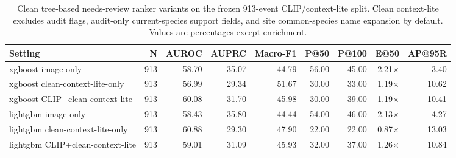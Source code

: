 \begin{table}[h]
\centering
\caption{Clean tree-based needs-review ranker variants on the frozen 913-event CLIP/context-lite split. Clean context-lite excludes audit flags, audit-only current-species support fields, and site common-species name expansion by default. Values are percentages except enrichment.}
\label{tab:needs_review_tree_rankers_clean}
\scriptsize
\setlength{\tabcolsep}{3pt}
\begin{tabular}{lrrrrrrrr}
\toprule
Setting & N & AUROC & AUPRC & Macro-F1 & P@50 & P@100 & E@50 & AP@95R \\
\midrule
xgboost image-only & 913 & 58.70 & 35.07 & 44.79 & 56.00 & 45.00 & 2.21$\times$ & 3.40 \\
xgboost clean-context-lite-only & 913 & 56.99 & 29.34 & 51.67 & 30.00 & 33.00 & 1.19$\times$ & 10.62 \\
xgboost CLIP+clean-context-lite & 913 & 60.08 & 31.70 & 45.98 & 30.00 & 39.00 & 1.19$\times$ & 10.41 \\
lightgbm image-only & 913 & 58.43 & 35.80 & 44.44 & 54.00 & 46.00 & 2.13$\times$ & 4.27 \\
lightgbm clean-context-lite-only & 913 & 60.88 & 29.30 & 47.90 & 22.00 & 22.00 & 0.87$\times$ & 13.03 \\
lightgbm CLIP+clean-context-lite & 913 & 59.01 & 31.09 & 45.93 & 32.00 & 37.00 & 1.26$\times$ & 10.84 \\
\bottomrule
\end{tabular}
\end{table}
